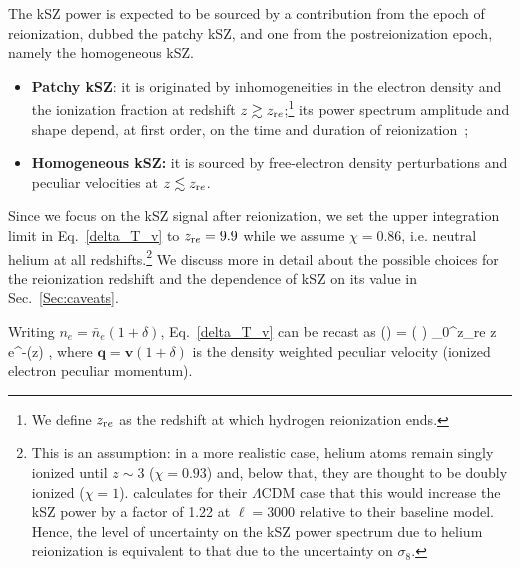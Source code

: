 The kSZ power is expected to be sourced by a contribution from the epoch of reionization, dubbed the patchy kSZ,  and one from the postreionization epoch, namely the homogeneous kSZ. 
\begin{itemize}
\item{\textbf{Patchy kSZ}: it is originated by inhomogeneities in the electron density and the ionization fraction at redshift $z \gtrsim z_{\rm re}$;\footnote{We define $z_{\rm re}$ as the redshift at which hydrogen reionization ends.} its power spectrum amplitude and shape depend, at first order, on the time and duration of reionization~\citep{Zahn2005,McQuinn2005};}
\item{\textbf{Homogeneous kSZ:} it is sourced by free-electron density perturbations and peculiar velocities at $z \lesssim z_{\rm re}$.}
\end{itemize} 
Since we focus on the  kSZ signal after reionization, we set the upper integration limit in Eq.~\eqref{delta_T_v} to $z_{\rm re} = 9.9$ while we assume $\chi=0.86$, i.e. neutral helium at all redshifts.\footnote{This is an assumption: in a more realistic case, helium atoms remain singly ionized until $z\sim 3$ ($\chi=0.93$) and, below that, they are thought to be doubly ionized ($\chi = 1$). \cite{Shaw2012} calculates for their $\Lambda$CDM case that this would increase the kSZ power by a factor of 1.22 at $\ell = 3000$ relative to their baseline model. Hence, the level of uncertainty on the kSZ power spectrum due to helium reionization is equivalent to that due to the uncertainty on $\sigma_8$.} We discuss more in detail about the possible choices for the reionization redshift and the dependence of kSZ on its value in Sec.~\eqref{Sec:caveats}.

Writing $n_e = \bar{n}_e(1+\delta)$, Eq.~\eqref{delta_T_v} can be recast as 
\be
\label{delta_T_q}
(\nver)  = \Bigl(  \Bigr) \int_0^{z_{\rm re}} \diff z \chi e^{-\tau(z)}  \cdot \nver,
\ee
where $\mathbf{q} = \mathbf{v}(1+\delta)$ is the density weighted peculiar velocity (ionized electron peculiar momentum).

